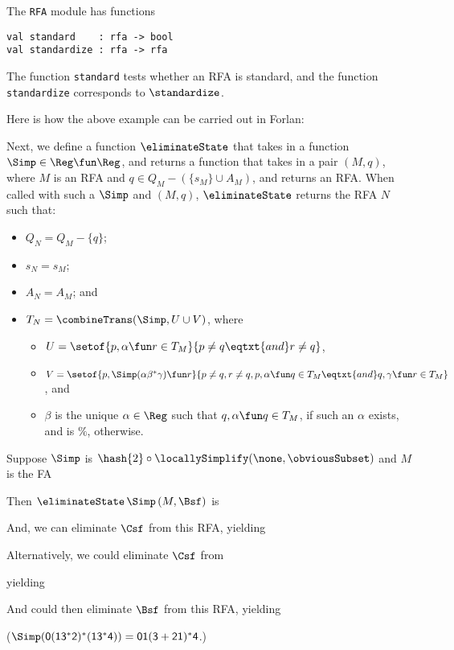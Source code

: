 The \texttt{RFA} module has functions
\begin{verbatim}
val standard    : rfa -> bool
val standardize : rfa -> rfa
\end{verbatim}
The function \texttt{standard} tests whether an RFA is standard,
and the function \texttt{standardize} corresponds to
$\standardize$.

Here is how the above example can be carried out in Forlan:


Next, we define a function $\eliminateState$ that takes in a function
$\Simp\in\Reg\fun\Reg$, and returns a function that takes in a pair
$(M, q)$, where $M$ is an RFA and $q\in Q_M-(\{s_M\}\cup A_M)$, and
returns an RFA.  When called with such a $\Simp$ and $(M,q)$,
$\eliminateState$ returns the RFA $N$ such that:
\begin{itemize}
\item $Q_N = Q_M - \{q\}$;

\item $s_N = s_M$;

\item $A_N = A_M$; and

\item $T_N = \combineTrans(\Simp, U\cup V)$, where
  \begin{itemize}
  \item $U = \setof{p,\alpha\fun r\in T_M}{p\neq q\eqtxt{and}r\neq
      q}$,

  \item $V = \setof{p,\Simp(\alpha\beta^*\gamma)\fun r}{p\neq q, r\neq
      q, p,\alpha\fun q\in T_M \eqtxt{and} q,\gamma\fun r\in T_M}$, and

  \item $\beta$ is the unique $\alpha\in\Reg$ such that
    $q,\alpha\fun q\in T_M$, if such an $\alpha$ exists, and is $\%$,
    otherwise.
  \end{itemize}
\end{itemize}

Suppose $\Simp$ is $\hash{2} \mathbin{\circ}
\locallySimplify(\none,\obviousSubset)$ and $M$ is the FA
\begin{center}

\end{center}
Then $\eliminateState\,\Simp\,(M, \Bsf)$ is
\begin{center}

\end{center}
And, we can eliminate $\Csf$ from this RFA, yielding
\begin{center}

\end{center}
Alternatively, we could eliminate $\Csf$ from
\begin{center}

\end{center}
yielding
\begin{center}

\end{center}
And could then eliminate $\Bsf$ from this RFA, yielding
\begin{center}

\end{center}
($\Simp(\mathsf{0(13^*2)^*(13^*4)}) = \mathsf{01(3+21)^*4}$.)

